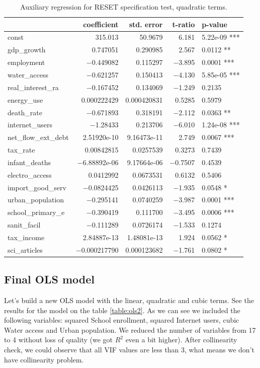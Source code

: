 \documentclass{article}
\begin{document}
\begin{table}[H]
\begin{center}
\begin{tabular}{lrrrl}
\toprule
& coefficient & std. error  & t-ratio & p-value \\
\toprule
const & 315.013 & 50.9679 & 6.181 & 5.22e-09 *** \\
gdp\_growth & 0.747051  & 0.290985  & 2.567 & 0.0112 ** \\
employment  & −0.449082 & 0.115297  & −3.895  & 0.0001 *** \\
water\_access & −0.621257 & 0.150413  & −4.130  & 5.85e-05 *** \\
real\_interest\_ra~ & −0.167452 & 0.134069  & −1.249  & 0.2135  \\
energy\_use & 0.000222429 & 0.000420831 & 0.5285  & 0.5979 \\
death\_rate & −0.671893 & 0.318191  & −2.112  & 0.0363 ** \\
internet\_users & −1.28433  & 0.213706  & −6.010  & 1.24e-08 *** \\
net\_flow\_ext\_debt  & 2.51920e-10 & 9.16473e-11 & 2.749 & 0.0067 *** \\
tax\_rate & 0.00842815  & 0.0257539 & 0.3273  & 0.7439 \\
infant\_deaths  & −6.88892e-06  & 9.17664e-06 & −0.7507 & 0.4539  \\
electro\_access & 0.0412992 & 0.0673531 & 0.6132  & 0.5406 \\
import\_good\_serv  & −0.0824425  & 0.0426113 & −1.935  & 0.0548 * \\
urban\_population & −0.295141 & 0.0740259 & −3.987  & 0.0001 *** \\
school\_primary\_e~ & −0.390419 & 0.111700  & −3.495  & 0.0006 *** \\
sanit\_facil  & −0.111289 & 0.0726174 & −1.533  & 0.1274 \\
tax\_income & 2.84887e-13 & 1.48081e-13 & 1.924 & 0.0562 * \\
sci\_articles & −0.000217790  & 0.000123682 & −1.761  & 0.0802 * \\
\toprule
\end{tabular}
\end{center}
\caption{Auxiliary regression for RESET specification test, quadratic terms.}
\label{table:reset}
\end{table}


\subsection{Final OLS model}
Let's build a new OLS model with the linear, quadratic and cubic terms. See the results for the model on the table \ref{table:ols2}. As we can see we included the following variables: squared School enrollment, squared Internet users, cubic Water access and Urban population. We reduced the number of variables from 17 to 4 without loss of quality (we got $R^2$ even a bit higher). After collinearity check, we could observe that all VIF values are less than 3, what means we don't have collinearity problem.\\
\end{document}

